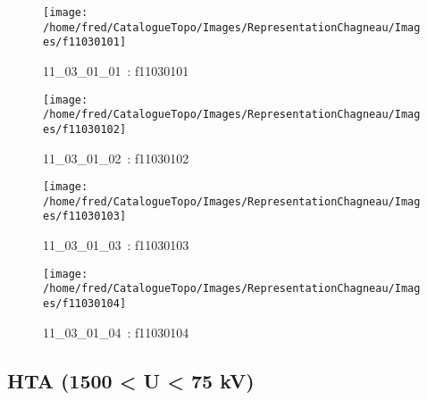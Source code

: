\documentclass[12pt,titlepage]{book}
\begin{document}
\begin{figure}[h!]
  \hfill         %
  \begin{minipage}[t]{3cm}
    \begin{center}
      \texttt{[image: /home/fred/CatalogueTopo/Images/RepresentationChagneau/Images/f11030101]}
      \caption[~11\_03\_01\_01]{\small{11\_03\_01\_01~:} \tiny{f11030101}}\label{f11030101}
    \end{center}
  \end{minipage}
  \begin{minipage}[t]{3cm}
    \begin{center}
      \texttt{[image: /home/fred/CatalogueTopo/Images/RepresentationChagneau/Images/f11030102]}
      \caption[~11\_03\_01\_02]{\small{11\_03\_01\_02~:} \tiny{f11030102}}\label{f11030102}
    \end{center}
  \end{minipage}
  \begin{minipage}[t]{3cm}
    \begin{center}
      \texttt{[image: /home/fred/CatalogueTopo/Images/RepresentationChagneau/Images/f11030103]}
      \caption[~11\_03\_01\_03]{\small{11\_03\_01\_03~:} \tiny{f11030103}}\label{f11030103}
    \end{center}
  \end{minipage}
  \begin{minipage}[t]{3cm}
    \begin{center}
      \texttt{[image: /home/fred/CatalogueTopo/Images/RepresentationChagneau/Images/f11030104]}
      \caption[~11\_03\_01\_04]{\small{11\_03\_01\_04~:} \tiny{f11030104}}\label{f11030104}
    \end{center}
  \end{minipage}
\end{figure}


\subsection{HTA (1500 < U < 75 kV)}
\noindent
\vspace{\baselineskip}
\end{document}
